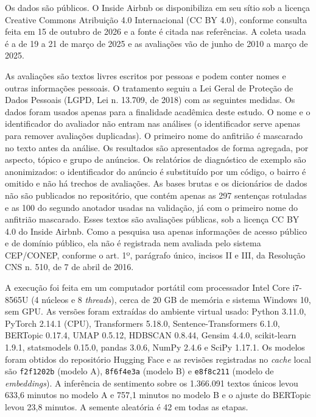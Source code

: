 Os dados são públicos. O Inside Airbnb os disponibiliza em seu sítio sob a licença Creative Commons Atribuição 4.0 Internacional (CC BY 4.0), conforme consulta feita em 15 de outubro de 2026 e a fonte é citada nas referências. A coleta usada é a de 19 a 21 de março de 2025 e as avaliações vão de junho de 2010 a março de 2025.

As avaliações são textos livres escritos por pessoas e podem conter nomes e outras informações pessoais. O tratamento seguiu a Lei Geral de Proteção de Dados Pessoais (LGPD, Lei n. 13.709, de 2018) com as seguintes medidas. Os dados foram usados apenas para a finalidade acadêmica deste estudo. O nome e o identificador do avaliador não entram nas análises (o identificador serve apenas para remover avaliações duplicadas). O primeiro nome do anfitrião é mascarado no texto antes da análise. Os resultados são apresentados de forma agregada, por aspecto, tópico e grupo de anúncios. Os relatórios de diagnóstico de exemplo são anonimizados: o identificador do anúncio é substituído por um código, o bairro é omitido e não há trechos de avaliações. As bases brutas e os dicionários de dados não são publicados no repositório, que contém apenas as 297 sentenças rotuladas e as 100 do segundo anotador usadas na validação, já com o primeiro nome do anfitrião mascarado. Esses textos são avaliações públicas, sob a licença CC BY 4.0 do Inside Airbnb. Como a pesquisa usa apenas informações de acesso público e de domínio público, ela não é registrada nem avaliada pelo sistema CEP/CONEP, conforme o art. 1º, parágrafo único, incisos II e III, da Resolução CNS n. 510, de 7 de abril de 2016.

A execução foi feita em um computador portátil com processador Intel Core i7-8565U (4 núcleos e 8 \textit{threads}), cerca de 20 GB de memória e sistema Windows 10, sem GPU. As versões foram extraídas do ambiente virtual usado: Python 3.11.0, PyTorch 2.14.1 (CPU), Transformers 5.18.0, Sentence-Transformers 6.1.0, BERTopic 0.17.4, UMAP 0.5.12, HDBSCAN 0.8.44, Gensim 4.4.0, scikit-learn 1.9.1, statsmodels 0.15.0, pandas 3.0.6, NumPy 2.4.6 e SciPy 1.17.1. Os modelos foram obtidos do repositório Hugging Face e as revisões registradas no \textit{cache} local são \texttt{f2f1202b} (modelo A), \texttt{8f6f4e3a} (modelo B) e \texttt{e8f8c211} (modelo de \textit{embeddings}). A inferência de sentimento sobre os 1.366.091 textos únicos levou 633,6 minutos no modelo A e 757,1 minutos no modelo B e o ajuste do BERTopic levou 23,8 minutos. A semente aleatória é 42 em todas as etapas.


